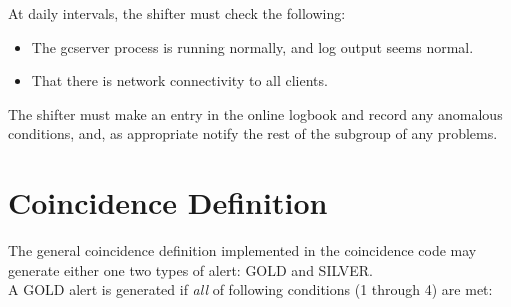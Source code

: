\documentclass{article}
\begin{document}
At daily intervals, the shifter must check the following:

\begin{itemize}
\item The gcserver process is running normally, and log output seems normal.
\item That there is network connectivity to all clients.

\end{itemize}

The shifter must make an entry in the online logbook and record any
anomalous conditions, and, as appropriate notify the rest of the subgroup
of any problems.



\section{Coincidence Definition}

The general coincidence definition implemented in the coincidence code
may generate either one two types of alert: GOLD and SILVER.\\
A GOLD alert is generated if {\it all} of
following conditions (1 through 4) are met:
\end{document}
